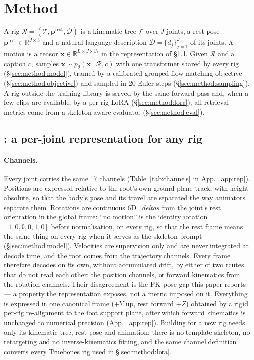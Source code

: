 \section{Method}\label{sec:method}

A rig $\mathcal{R}=(\mathcal{T},\mathbf{p}^{\mathrm{rest}},\mathcal{D})$ is a kinematic tree
$\mathcal{T}$ over $J$ joints, a rest pose $\mathbf{p}^{\mathrm{rest}}\in\mathbb{R}^{J\times3}$ and
a natural-language description $\mathcal{D}=\{d_j\}_{j=1}^{J}$ of its joints. A motion is a tensor
$\mathbf{x}\in\mathbb{R}^{L\times J\times 17}$ in the \rep{} representation of
\S\ref{sec:method:rep}. Given $\mathcal{R}$ and a caption $c$, \method{} samples
$\mathbf{x}\sim p_\theta(\mathbf{x}\mid\mathcal{R},c)$ with one transformer shared by every rig
(\S\ref{sec:method:model}), trained by a calibrated grouped flow-matching objective
(\S\ref{sec:method:objective}) and sampled in 20 Euler steps
(\S\ref{sec:method:sampling}). A rig outside the training library is served by the same
forward pass and, when a few clips are available, by a per-rig LoRA
(\S\ref{sec:method:lora}); all retrieval metrics come from a skeleton-aware evaluator
(\S\ref{sec:method:eval}).

\subsection{\rep{}: a per-joint representation for any rig}\label{sec:method:rep}

\paragraph{Channels.} Every joint carries the same 17 channels (Table~\ref{tab:channels} in App.~\ref{app:rep}). Positions
are expressed relative to the root's own ground-plane track, with height absolute, so
that the body's pose and its travel are separated the way animators separate them. Rotations are
continuous 6D~\citep{zhou2019continuity} \emph{deltas} from the joint's rest orientation in the global
frame: ``no motion'' is the identity rotation, $[1,0,0,0,1,0]$ before normalisation, on every rig,
so that the rest frame means the same thing on every rig when it serves as the skeleton prompt
(\S\ref{sec:method:model}). Velocities are supervision only and are never
integrated at decode time, and the root comes from the trajectory channels. Every frame therefore decodes on its
own, without accumulated drift, by either of two routes that do not read each other: the position channels, or
forward kinematics from the rotation channels. Their disagreement is the FK--pose gap this paper reports --- a property
the representation exposes, not a metric imposed on it. Everything is expressed in one canonical frame ($+Y$ up, rest forward $+Z$) obtained
by a rigid per-rig re-alignment to the foot support plane, after which forward kinematics is
unchanged to numerical precision (App.~\ref{app:rep}). Building \rep{} for a new rig needs only its
kinematic tree, rest pose and animation: there is no template skeleton, no retargeting and no
inverse-kinematics fitting, and the same channel definition converts every
Truebones rig used in \S\ref{sec:method:lora}.

